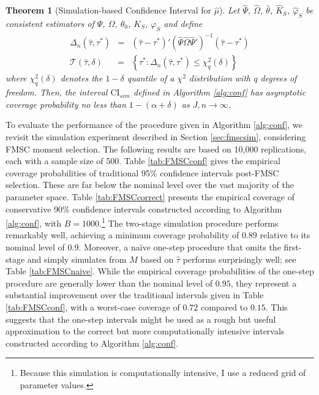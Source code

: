 \documentclass[12pt]{article}
\newtheorem{thm}{Theorem}[section]
\theoremstyle{definition}
\begin{document}
\begin{thm}[Simulation-based Confidence Interval for $\widehat{\mu}$]
\label{pro:sim}
Let $\widehat{\Psi}$, $\widehat{\Omega}$, $\widehat{\theta}$, $\widehat{K}_S$, $\widehat{\varphi}_S$ be consistent estimators of $\Psi$, $\Omega$, $\theta_0$, $K_S$, $\varphi_S$ and define 
\begin{eqnarray*}
	\Delta_n(\widehat{\tau},\tau^*) &=& \left(\widehat{\tau} - \tau^*\right)' \left(\widehat{\Psi}\widehat{\Omega}\widehat{\Psi}'\right)^{-1} \left(\widehat{\tau} - \tau^*\right)\\
	\mathscr{T}(\widehat{\tau},\delta) &=& \left\{\tau^* \colon  \Delta_n(\widehat{\tau},\tau^*) \leq \chi^2_q(\delta)\right\}
\end{eqnarray*}
where $\chi^2_q(\delta)$ denotes the $1-\delta$ quantile of a $\chi^2$ distribution with $q$ degrees of freedom.
Then, the interval $\mbox{CI}_{sim}$ defined in Algorithm \ref{alg:conf} has asymptotic coverage probability no less than $1-(\alpha + \delta)$ as $J,n\rightarrow \infty$.
\end{thm}


To evaluate the performance of the procedure given in Algorithm \ref{alg:conf}, we revisit the simulation experiment described in Section \ref{sec:fmscsim}, considering FMSC moment selection. The following results are based on 10,000 replications, each with a sample size of 500. Table \ref{tab:FMSCconf} gives the empirical coverage probabilities of traditional 95\% confidence intervals post-FMSC selection. These are far below the nominal level over the vast majority of the parameter space. Table \ref{tab:FMSCcorrect} presents the empirical coverage of conservative 90\% confidence intervals constructed according to Algorithm \ref{alg:conf}, with $B=1000$.\footnote{Because this simulation is computationally intensive, I use a reduced grid of parameter values.} The two-stage simulation procedure performs remarkably well, achieving a minimum coverage probability of $0.89$ relative to its nominal level of $0.9$. Moreover, a na\"{i}ve one-step procedure that omits the first-stage and simply simulates from $M$ based on $\widehat{\tau}$ performs surprisingly well; see Table \ref{tab:FMSCnaive}. While the empirical coverage probabilities of the one-step procedure are generally lower than the nominal level of $0.95$, they represent a substantial improvement over the traditional intervals given in Table \ref{tab:FMSCconf}, with a worst-case coverage of $0.72$ compared to $0.15$. This suggests that the one-step intervals might be used as a rough but useful approximation to the correct but more computationally intensive intervals constructed according to Algorithm \ref{alg:conf}.
\end{document}
